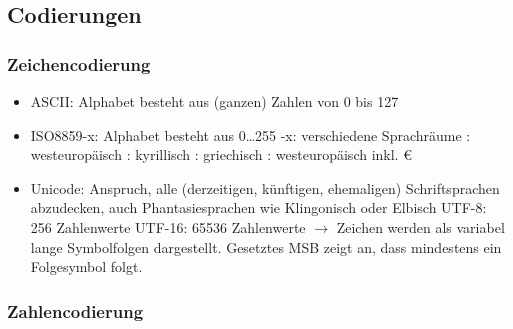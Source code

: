 \documentclass[10pt,a4paper]{scrartcl}
\begin{document}
	\subsection{Codierungen}
	\subsubsection{Zeichencodierung}
	\begin{itemize}
		\item ASCII: Alphabet besteht aus (ganzen) Zahlen von 0 bis 127
		\item ISO8859-x: Alphabet besteht aus 0\dots255
		\subitem -x: verschiedene Sprachräume
		: westeuropäisch
		: kyrillisch
		: griechisch
		: westeuropäisch inkl. \euro{}
		\item Unicode: Anspruch, alle (derzeitigen, künftigen, ehemaligen) Schriftsprachen abzudecken, auch Phantasiesprachen wie Klingonisch oder Elbisch
		\subitem UTF-8: 256 Zahlenwerte
		\subitem UTF-16: 65536 Zahlenwerte
		\subitem$ \rightarrow $ Zeichen werden als variabel lange Symbolfolgen dargestellt. Gesetztes MSB zeigt an, dass mindestens ein Folgesymbol folgt.
	\end{itemize}
	\subsubsection{Zahlencodierung}
\end{document}
